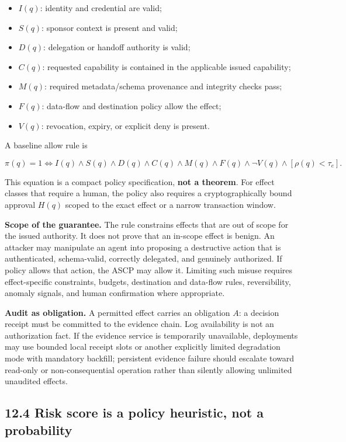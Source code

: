 \documentclass[
  10pt,
  letterpaper,
]{article}
\providecommand{\tightlist}{%
  \setlength{\itemsep}{0pt}\setlength{\parskip}{0pt}}
\begin{document}
\begin{itemize}
\tightlist
\item
  \(I(q)\): identity and credential are valid;
\item
  \(S(q)\): sponsor context is present and valid;
\item
  \(D(q)\): delegation or handoff authority is valid;
\item
  \(C(q)\): requested capability is contained in the applicable issued
  capability;
\item
  \(M(q)\): required metadata/schema provenance and integrity checks
  pass;
\item
  \(F(q)\): data-flow and destination policy allow the effect;
\item
  \(V(q)\): revocation, expiry, or explicit deny is present.
\end{itemize}

A baseline allow rule is

\[
\pi(q)=1
\iff
I(q)\land S(q)\land D(q)\land C(q)\land M(q)\land F(q)
\land \neg V(q)\land [\rho(q)<\tau_e].
\]

This equation is a compact policy specification, \textbf{not a theorem}.
For effect classes that require a human, the policy also requires a
cryptographically bound approval \(H(q)\) scoped to the exact effect or
a narrow transaction window.

\textbf{Scope of the guarantee.} The rule constrains effects that are
out of scope for the issued authority. It does not prove that an
in-scope effect is benign. An attacker may manipulate an agent into
proposing a destructive action that is authenticated, schema-valid,
correctly delegated, and genuinely authorized. If policy allows that
action, the ASCP may allow it. Limiting such misuse requires
effect-specific constraints, budgets, destination and data-flow rules,
reversibility, anomaly signals, and human confirmation where
appropriate.

\textbf{Audit as obligation.} A permitted effect carries an obligation
\(A\): a decision receipt must be committed to the evidence chain. Log
availability is not an authorization fact. If the evidence service is
temporarily unavailable, deployments may use bounded local receipt slots
or another explicitly limited degradation mode with mandatory backfill;
persistent evidence failure should escalate toward read-only or
non-consequential operation rather than silently allowing unlimited
unaudited effects.

\subsection{12.4 Risk score is a policy heuristic, not a
probability}\label{risk-score-is-a-policy-heuristic-not-a-probability}
\end{document}
